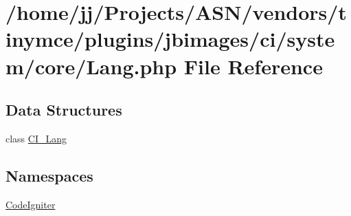 \hypertarget{_lang_8php}{}\section{/home/jj/\+Projects/\+A\+S\+N/vendors/tinymce/plugins/jbimages/ci/system/core/\+Lang.php File Reference}
\label{_lang_8php}
\subsection*{Data Structures}
\begin{DoxyCompactItemize}
\item 
class \hyperlink{class_c_i___lang}{C\+I\+\_\+\+Lang}
\end{DoxyCompactItemize}
\subsection*{Namespaces}
\begin{DoxyCompactItemize}
\item 
 \hyperlink{namespace_code_igniter}{Code\+Igniter}
\end{DoxyCompactItemize}

